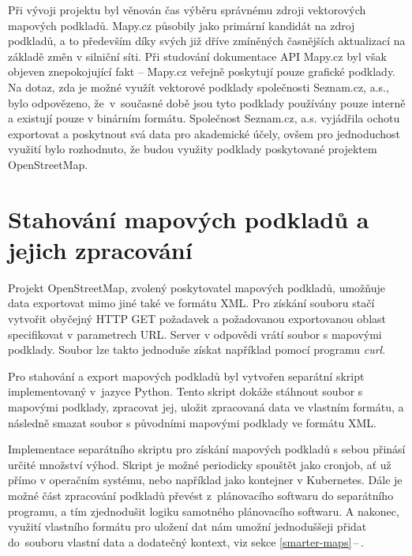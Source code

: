 \documentclass[czech, bachelor]{diploma}
\newcommand{\peteref}[1]{\ref{#1}\,--\,\nameref{#1}}
\begin{document}
Při vývoji projektu byl věnován čas výběru správnému zdroji vektorových mapových podkladů. Mapy.cz působily jako primární kandidát
na zdroj podkladů, a to především díky svých již dříve zmíněných časnějších aktualizací na základě změn v silniční síti.
Při studování dokumentace API Mapy.cz byl však objeven znepokojující fakt -- Mapy.cz veřejně poskytují pouze grafické podklady.
Na dotaz, zda je možné využít vektorové podklady společnosti Seznam.cz, a.s., bylo odpovězeno, že~v~současné době jsou tyto
podklady používány pouze interně a existují pouze v binárním formátu. Společnost Seznam.cz, a.s. vyjádřila ochotu exportovat
a poskytnout svá data pro akademické účely, ovšem pro jednoduchost využití bylo rozhodnuto, že budou využity podklady poskytované
projektem OpenStreetMap.

\section{Stahování mapových podkladů a jejich zpracování}

Projekt OpenStreetMap, zvolený poskytovatel mapových podkladů, umožňuje data exportovat mimo jiné také ve formátu XML. Pro získání
souboru stačí vytvořit obyčejný HTTP GET požadavek a požadovanou exportovanou oblast specifikovat v parametrech URL. Server
v odpovědi vrátí soubor s mapovými podklady. Soubor lze takto jednoduše získat například pomocí programu \emph{curl}.

Pro stahování a export mapových podkladů byl vytvořen separátní skript implementovaný v~jazyce Python. Tento skript dokáže
stáhnout soubor s mapovými podklady, zpracovat jej, uložit zpracovaná data ve vlastním formátu, a následně smazat soubor
s původními mapovými podklady ve formátu XML.

Implementace separátního skriptu pro získání mapových podkladů s sebou přinásí určité množství výhod. Skript je možné periodicky
spouštět jako cronjob, ať už přímo v operačním systému, nebo například jako kontejner v Kubernetes. Dále je možné část zpracování
podkladů převést z~plánovacího softwaru do separátního programu, a tím zjednodušit logiku samotného plánovacího softwaru.
A nakonec, využití vlastního formátu pro uložení dat nám umožní jednoduššeji přidat do~souboru vlastní data a dodatečný kontext,
viz sekce \peteref{smarter-maps}.
\end{document}
